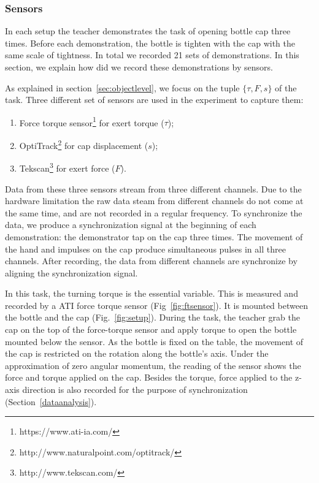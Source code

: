 \documentclass[preprint,12pt]{elsarticle}
\begin{document}
\subsubsection{Sensors}
\label{sec:sensor}
In each setup the teacher demonstrates the task of opening bottle cap three times. Before each demonstration, the bottle is tighten with the cap with the same scale of tightness. In total we recorded 21 sets of demonstrations. In this section, we explain how did we record these demonstrations by sensors.



As explained in section~\ref{sec:objectlevel}, we focus on the tuple $\{\tau,F,s\}$ of the task. Three different set of sensors are used in the experiment to capture them:

\begin{enumerate}
\item Force torque sensor\footnote{https://www.ati-ia.com/} for exert torque ($\tau$);
\item OptiTrack\footnote{http://www.naturalpoint.com/optitrack/} for cap displacement ($s$);
\item Tekscan\footnote{http://www.tekscan.com/} for exert force ($F$).
\end{enumerate}

Data from these three sensors stream from three different channels. Due to the hardware limitation the raw data steam from different channels do not come at the same time, and are not recorded in a regular frequency. To synchronize the data, we produce a synchronization signal at the beginning of each demonstration: the demonstrator tap on the cap three times. The movement of the hand and impulses on the cap produce simultaneous pulses in all three channels. After recording, the data from different channels are synchronize by aligning the synchronization signal.

In this task, the turning torque is the essential variable. This is measured and recorded by a ATI force torque sensor (Fig~\ref{fig:ftsensor}). It is mounted between the bottle and the cap (Fig.~\ref{fig:setup}). During the task, the teacher grab the cap on the top of the force-torque sensor and apply torque to open the bottle mounted below the sensor. As the bottle is fixed on the table, the movement of the cap is restricted on the rotation along the bottle's axis. Under the approximation of zero angular momentum, the reading of the sensor shows the force and torque applied on the cap. Besides the torque, force applied to the z-axis direction is also recorded for the purpose of synchronization (Section~\ref{dataanalysis}).
\end{document}
